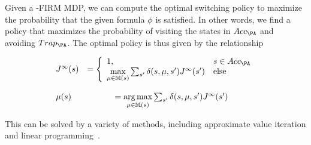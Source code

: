 Given a \DTL-FIRM MDP, we can compute the optimal switching policy to maximize the probability that the given formula $\phi$ is satisfied.  
%
%
In other words, we %
find a policy that maximizes the probability of visiting the states in $Acc_\PA$ and avoiding $Trap_\PA$.
The optimal policy is thus given by the relationship

\begin{align}
\label{eq:dp}
\begin{array}{lcl}
J^{\infty}(s) &= \left \{ \begin{array}{ll}
1, &  s \in Acc_\PA \\ 
\underset{\mu \in \mathbb{M}(s)}{\max} \sum_{s'} \delta(s,\mu,s')J^{\infty}(s') & \text{else} 
\end{array} \right .  \\ \\
\mu(s) &= \underset{\mu \in \mathbb{M}(s)}{\arg \max} \sum_{s'} \delta(s,\mu,s')J^{\infty}(s')
\end{array}
\end{align} 

This can be solved by a variety of methods, including approximate value iteration and linear programming~\cite{Bertsekas2012}.
